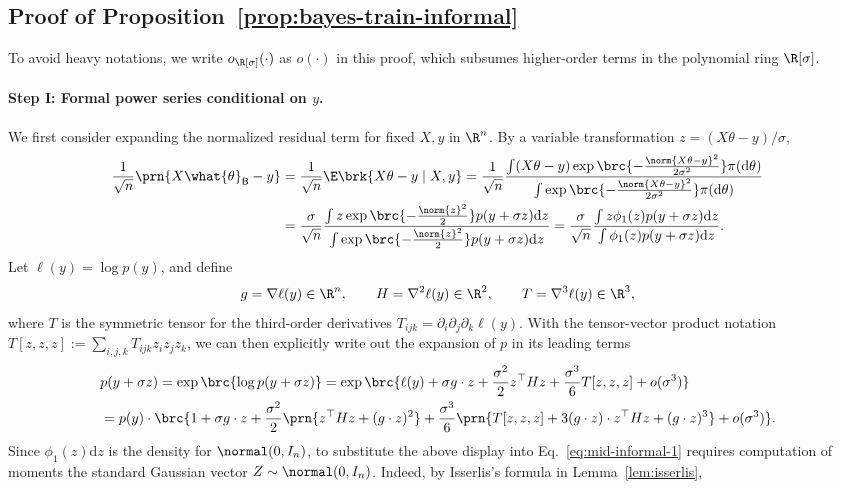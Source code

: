 \documentclass[11pt]{article}
\newcommand{\bysest}{\what{\theta}_{\mathsf{B}}}
\newcommand{\de}{\mathrm{d}}
\begin{document}
\subsection{Proof of Proposition~\ref{prop:bayes-train-informal}} \label{proof:bayes-train-informal}
To avoid heavy notations, we write $o_{\R[\sigma]}(\cdot)$ as $o(\cdot)$ in this proof, which subsumes higher-order terms in the polynomial ring $\R[\sigma]$.
\paragraph{Step I: Formal power series conditional on $y$.} We first consider expanding the normalized residual term for fixed $X, y$ in $\R^n$. By a variable transformation $z = (X\theta - y)/\sigma$,
\begin{align}
    \frac{1}{\sqrt{n}} \prn{X\bysest - y} & = \frac{1}{\sqrt{n}}\E \brk{X\theta -y \mid X, y} = \frac{1}{\sqrt{n}}\frac{\int (X\theta-y) \exp \brc{-\frac{\norm{X \theta - y}^2}{2 \sigma^2}} \pi(\de \theta) }{\int \exp \brc{-\frac{\norm{X \theta - y}^2}{2 \sigma^2}} \pi(\de \theta) } \nonumber \\
    & = \frac{\sigma}{\sqrt{n}}\frac{\int z \exp \brc{-\frac{\norm{z}^2}{2}}p(y+\sigma z) \de z }{\int \exp \brc{-\frac{\norm{z}^2}{2}} p(y + \sigma z) \de z } = \frac{\sigma}{\sqrt{n}}\frac{\int z \phi_1(z) p(y+\sigma z) \de z }{\int \phi_1(z) p(y + \sigma z) \de z }. \label{eq:mid-informal-1}
\end{align}
Let $\ell(y) = \log p(y)$, and define
\begin{align*}
    g = \nabla \ell(y) \in \R^n, \qquad H = \nabla^2 \ell(y) \in \R^2, \qquad T = \nabla^3 \ell(y) \in \R^3,
\end{align*}
where $T$ is the symmetric tensor for the third-order derivatives $T_{ijk} = \partial_i\partial_j\partial_k \ell(y)$. With the tensor-vector product notation $T[z,z,z] := \sum_{i,j,k} T_{ijk} z_iz_jz_k$, we can then explicitly write out the expansion of $p$ in its leading terms
\begin{align*}
    & p(y+\sigma z)  = \exp \brc{\log p(y+\sigma z)} = \exp \brc{\ell(y) + \sigma g \cdot z + \frac{\sigma^2}{2} z^\top H z +  \frac{\sigma^3}{6} T[z,z,z]  +  o(\sigma^3)} \nonumber \\
    & = p(y) \cdot \brc{1 + \sigma g \cdot z + \frac{\sigma^2}{2} \prn{z^\top H z  + (g\cdot z)^2}  + \frac{\sigma^3}{6} \prn{T[z, z, z]+ 3(g \cdot z) \cdot z^{\top} H z + (g \cdot z)^3} + o(\sigma^3)}.
\end{align*}
Since $\phi_1(z) \de z$ is the density for $\normal(0, I_n)$, to substitute the above display into Eq.~\eqref{eq:mid-informal-1} requires computation of moments the standard Gaussian vector $Z \sim \normal(0, I_n)$. Indeed, by Isserlis's formula in Lemma~\ref{lem:isserlis},
\end{document}
